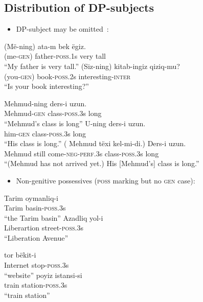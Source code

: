 \documentclass[letterpaper,12pt]{article}
\newcommand{\poss}[2]{\textsc{poss}.{\footnotesize #1}#2}
\newcommand{\posst}{\textsc{poss}}
\newcommand{\gen}{\textsc{gen}}
\begin{document}
\subsection{Distribution of DP-subjects}
\begin{itemize}
\item DP-subject may be omitted~\cite{Tomur,Dede}:
\end{itemize}
\begin{exe}
	\ex \gll (M\"e-ning) ata-m bek \"egiz.\\
					 (me-\gen{}) father-\poss{1}{s} very tall\\
			\glt ``My father is very tall.''
	\ex \gll (Siz-ning) kitab-ingiz qiziq-mu?\\
					 (you-\gen{}) book-\poss{2}{s} interesting-\textsc{inter}\\
			\glt ``Is your book interesting?''
\ex
	\begin{xlist}	
	\ex \gll Mehmud-ning ders-i uzun.\\
					 Mehmud-\gen{} class-\poss{3}{s} long\\
			\glt ``Mehmud's class is long''
	\ex \gll U-ning ders-i uzun.\\
					 him-\gen{} class-\poss{3}{s} long\\
			\glt ``His class is long.''
	\ex \gll ( Mehmud t\"exi kel-mi-di.) Ders-i uzun.\\
					 {} Mehmud still come-\textsc{neg}-\textsc{perf}.{\footnotesize 3}s class-\poss{3}{s} long\\
			\glt ``(Mehmud has not arrived yet.) His [Mehmud's] class is long.''
	\end{xlist}
\end{exe}
\begin{itemize}
\item Non-genitive possessives (\posst{} marking but no \gen{} case):
\end{itemize}
\begin{exe}
\ex
	\begin{xlist}
	\ex \gll Tarim oymanliq-i\\
					 Tarim	basin-\poss{3}{s}\\
			\glt ``the Tarim basin''
	\ex \gll Azadliq yol-i\\
					 Liberartion street-\poss{3}{s}\\
			\glt ``Liberation Avenue''
	\end{xlist}
\ex
	\begin{xlist}
	\ex	\gll tor b\"ekit-i\\
					 Internet stop-\poss{3}{s}\\
			\glt ``website''
	\ex	\gll poyiz istansi-si\\
			     train station-\poss{3}{s}\\
			\glt ``train station''
	\end{xlist}
\end{exe} 
\end{document}
